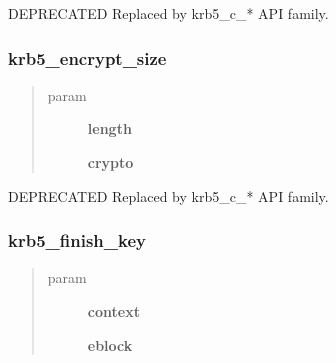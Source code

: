 \documentclass[letterpaper,10pt,english]{sphinxmanual}
\begin{document}
DEPRECATED Replaced by krb5\_c\_* API family.


\subsubsection{krb5\_encrypt\_size}
\label{appdev/refs/api/krb5_encrypt_size:krb5-encrypt-size}\label{appdev/refs/api/krb5_encrypt_size::doc}

\begin{fulllineitems}
\label{appdev/refs/api/krb5_encrypt_size:krb5_encrypt_size}
\end{fulllineitems}

\begin{quote}\begin{description}
\item[{param}] \leavevmode
\textbf{length}

\textbf{crypto}

\end{description}\end{quote}

DEPRECATED Replaced by krb5\_c\_* API family.


\subsubsection{krb5\_finish\_key}
\label{appdev/refs/api/krb5_finish_key:krb5-finish-key}\label{appdev/refs/api/krb5_finish_key::doc}

\begin{fulllineitems}
\label{appdev/refs/api/krb5_finish_key:krb5_finish_key}
\end{fulllineitems}

\begin{quote}\begin{description}
\item[{param}] \leavevmode
\textbf{context}

\textbf{eblock}

\end{description}\end{quote}
\end{document}

